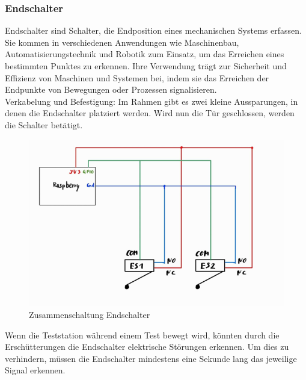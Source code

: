 \subsubsection{Endschalter}
Endschalter sind Schalter, die Endposition eines mechanischen Systems erfassen. Sie kommen in verschiedenen Anwendungen wie Maschinenbau, Automatisierungstechnik und Robotik zum Einsatz, um das Erreichen eines bestimmten Punktes zu erkennen. Ihre Verwendung trägt zur Sicherheit und Effizienz von Maschinen und Systemen bei, indem sie das Erreichen der Endpunkte von Bewegungen oder Prozessen signalisieren.\\
\vspace{3mm}
Verkabelung und Befestigung:
Im Rahmen gibt es zwei kleine Aussparungen, in denen die Endschalter platziert werden. Wird nun die Tür geschlossen, werden die Schalter betätigt.\\
\vspace{5mm}
\begin{figure}[H]
    \centering
    \includegraphics{image/Zusammenschaltung-Endschalter.png}
    \caption{Zusammenschaltung Endschalter}
    \label{fig:enter-label}
\end{figure}
Wenn die Teststation während einem Test bewegt wird, könnten durch die Erschütterungen die Endschalter elektrische Störungen erkennen. Um dies zu verhindern, müssen die Endschalter mindestens eine Sekunde lang das jeweilige Signal erkennen. 
